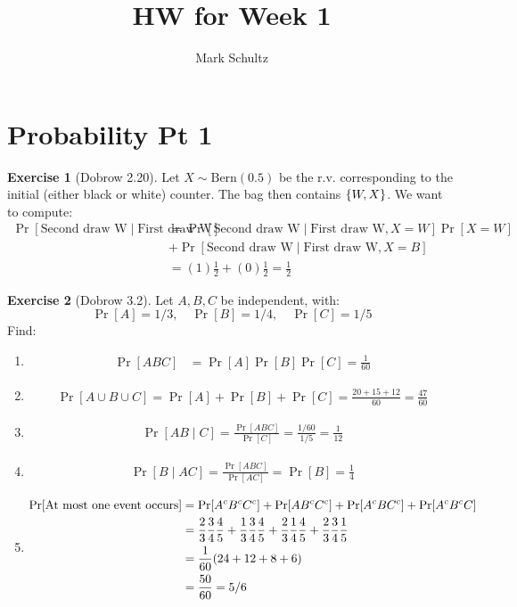 \documentclass{article}
\theoremstyle{definition}
\newtheorem{exercise}{Exercise}[section]
\begin{document}
\title{HW for Week 1}
\author{Mark Schultz}
\maketitle
\section{Probability Pt 1}
\begin{exercise}[Dobrow 2.20]
Let $X\sim\text{Bern}(0.5)$ be the r.v. corresponding to the initial (either black or white) counter.
The bag then contains $\Bqty{W, X}$.
We want to compute:
\begin{align*}
\Pr[\text{Second draw W}\mid\text{First draw W}] &= \Pr[\text{Second draw W}\mid\text{First draw W},X = W]\Pr[X = W] \\
&+ \Pr[\text{Second draw W}\mid \text{First draw W}, X = B] \\
& = (1)\frac{1}{2} + (0)\frac{1}{2} = \frac{1}{2}
\end{align*}
\end{exercise}
\begin{exercise}[Dobrow 3.2]
Let $A,B,C$ be independent, with:
\begin{equation}
\Pr[A] = 1/3,\quad\Pr[B] = 1/4,\quad \Pr[C] = 1/5
\end{equation}
Find:
\begin{enumerate}
\item \begin{align*}
\Pr[ABC] &= \Pr[A]\Pr[B]\Pr[C] = \frac{1}{60}
\end{align*}
\item \begin{align*}
\Pr[A\cup B\cup C] = \Pr[A] + \Pr[B] + \Pr[C] = \frac{20+15+12}{60} = \frac{47}{60}
\end{align*}
\item \begin{align*}
\Pr[AB\mid C] = \frac{\Pr[ABC]}{\Pr[C]} = \frac{1/60}{1/5} = \frac{1}{12}
\end{align*}
\item \begin{align*}
\Pr[B\mid AC] = \frac{\Pr[ABC]}{\Pr[AC]} = \Pr[B] = \frac{1}{4}
\end{align*}
\item \begin{align*}
\Pr[\text{At most one event occurs}] &= \Pr[A^cB^cC^c]+ \Pr[AB^cC^c] + \Pr[A^cBC^c] + \Pr[A^cB^cC] \\
& = \frac{2}{3}\frac{3}{4}\frac{4}{5} + \frac{1}{3}\frac{3}{4}\frac{4}{5} + \frac{2}{3}\frac{1}{4}\frac{4}{5} + \frac{2}{3}\frac{3}{4}\frac{1}{5} \\
& = \frac{1}{60}\pqty{24 + 12 + 8 + 6} \\
& = \frac{50}{60} = 5/6
\end{align*}
\end{enumerate}
\end{exercise}
\end{document}
